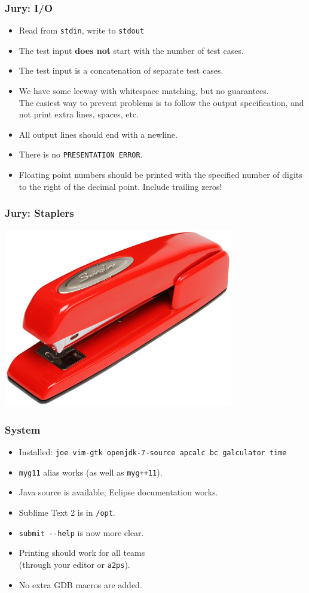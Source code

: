 \documentclass[t]{beamer}
\begin{document}
\begin{frame}[fragile]
    \frametitle{Jury: I/O}
	\begin{itemize}
		\item Read from \lstinline|stdin|, write to \lstinline|stdout|
		\item The test input \textbf{does not} start with the number of test cases.
		\item The test input is a concatenation of separate test cases.
		\item We have some leeway with whitespace matching, but no guarantees. \\
		  The easiest way to prevent problems is to follow the output specification, and not print extra lines, spaces, etc.
		\item All output lines should end with a newline.
		\item There is no \lstinline|PRESENTATION ERROR|.
		\item Floating point numbers should be printed with the specified number of digits to the right of the decimal point. Include trailing zeros!
	 \end{itemize}
\end{frame}

\begin{frame}
    \frametitle{Jury: Staplers}
	\includegraphics[width=100mm]{stapler.jpg}
\end{frame}

\begin{frame}[fragile]
    \frametitle{System}
    \begin{itemize}
        \item Installed: \lstinline|joe vim-gtk openjdk-7-source apcalc bc galculator time|
        \item \lstinline|myg11| alias works (as well as \lstinline|myg++11|).
        \item Java source is available; Eclipse documentation works.
        \item Sublime Text 2 is in \lstinline|/opt|.
        \item \lstinline|submit --help| is now more clear.
        \item Printing should work for all teams\\(through your editor or \lstinline|a2ps|).
        \item No extra GDB macros are added.
     \end{itemize}
\end{frame}
\end{document}
